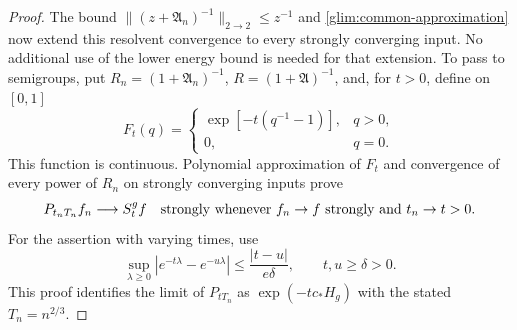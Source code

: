 \begin{proof}
The bound \(\|(z+\mathfrak A_n)^{-1}\|_{2\to2}\le z^{-1}\) and
\eqref{glim:common-approximation} now extend this resolvent convergence
to every strongly converging input.  No additional use of the lower
energy bound is needed for that extension.  To pass to semigroups, put
\(R_n=(1+\mathfrak A_n)^{-1}\), \(R=(1+\mathfrak A)^{-1}\), and, for
\(t>0\), define on \([0,1]\)
\[
 F_t(q)=
 \begin{cases}
 \exp[-t(q^{-1}-1)],&q>0,\\
 0,&q=0.
 \end{cases}
\]
This function is continuous.  Polynomial approximation of \(F_t\) and
convergence of every power of \(R_n\) on strongly converging inputs
prove
\begin{equation}
 P_{t_nT_n}f_n\longrightarrow S^g_t f
 \quad\text{strongly whenever \(f_n\to f\) strongly and \(t_n\to t>0\)}.
 \label{glim:semigroup-strong}
\end{equation}
For the assertion with varying times, use
\[
 \sup_{\lambda\ge0}|e^{-t\lambda}-e^{-u\lambda}|
 \le\frac{|t-u|}{e\delta},\qquad t,u\ge\delta>0.
\]
This proof identifies the limit of \(P_{tT_n}\) as
\(\exp(-t c_*H_g)\) with the stated \(T_n=n^{2/3}\).


\end{proof}
